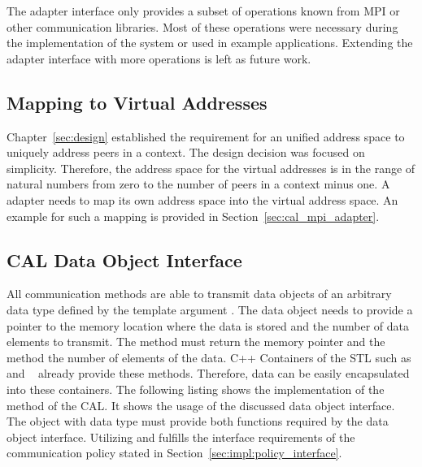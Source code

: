 \noindent The adapter interface only provides a subset of operations
known from MPI or other communication libraries.  Most of these
operations were necessary during the implementation of the system or
used in example applications. Extending the adapter interface with
more operations is left as future work.


\subsection{Mapping to Virtual Addresses}
\label{sec:impl:vaddr}
Chapter~\ref{sec:design} established the requirement for an unified address
space to uniquely address peers in a context. The design decision was
focused on simplicity. Therefore, the address space for the
virtual addresses is in the range of natural numbers from zero to the
number of peers in a context minus one. A adapter needs to map its
own address space into the virtual address space. An example for such a
mapping is provided in Section~\ref{sec:cal_mpi_adapter}.


\subsection{CAL Data Object Interface}
All communication methods are able to transmit data objects of an
arbitrary data type defined by the template argument . The
data object needs to provide a pointer to the memory location where
the data is stored and the number of data elements to transmit.  The
method  must return the memory pointer and the method
 the number of elements of the data. C++ Containers of the
STL such as  and ~\cite{ref:vector,
  ref:array} already provide these methods. Therefore, data can be
easily encapsulated into these containers. The following listing shows
the implementation of the  method of the CAL. It
shows the usage of the discussed data object interface.  The object
 with data type  must provide both functions
required by the data object interface. Utilizing 
and  fulfills the interface requirements of the
communication policy stated in
Section~\ref{sec:impl:policy_interface}.


